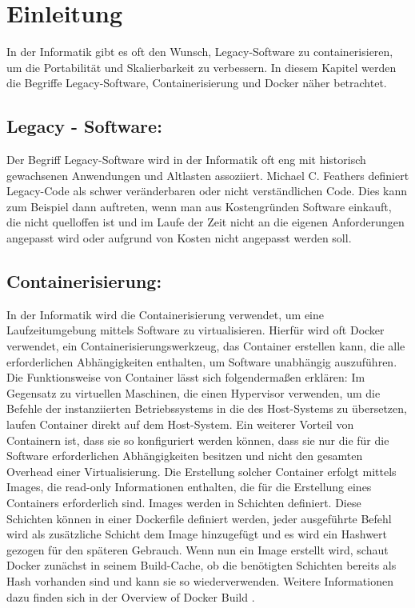 

\section{Einleitung}

In der Informatik gibt es oft den Wunsch, Legacy-Software zu containerisieren, um die Portabilität und Skalierbarkeit zu verbessern.
In diesem Kapitel werden die Begriffe Legacy-Software, Containerisierung und Docker näher betrachtet.
\subsection{Legacy - Software:}
Der Begriff Legacy-Software wird in der Informatik oft eng mit historisch gewachsenen Anwendungen und Altlasten assoziiert.
Michael C. Feathers definiert Legacy-Code als schwer veränderbaren oder nicht verständlichen Code.
Dies kann zum Beispiel dann auftreten, wenn man aus Kostengründen Software einkauft, die nicht quelloffen ist und im Laufe der Zeit nicht an die eigenen Anforderungen angepasst wird oder aufgrund von Kosten nicht angepasst werden soll. \cite{feathers2020effektives}
\subsection{Containerisierung:}
In der Informatik wird die Containerisierung verwendet, um eine Laufzeitumgebung mittels Software zu virtualisieren.
Hierfür wird oft Docker verwendet, ein Containerisierungswerkzeug, das Container erstellen kann, die alle erforderlichen Abhängigkeiten enthalten, um Software unabhängig auszuführen.
Die Funktionsweise von Container lässt sich folgendermaßen erklären: Im Gegensatz zu virtuellen Maschinen, die einen Hypervisor verwenden, um die Befehle der instanziierten Betriebssystems in die des Host-Systems zu übersetzen, laufen Container direkt auf dem Host-System.
Ein weiterer Vorteil von Containern ist, dass sie so konfiguriert werden können, dass sie nur die für die Software erforderlichen Abhängigkeiten besitzen und nicht den gesamten Overhead einer Virtualisierung.
Die Erstellung solcher Container erfolgt mittels Images, die read-only Informationen enthalten, die für die Erstellung eines Containers erforderlich sind. Images werden in Schichten definiert.
Diese Schichten können in einer Dockerfile definiert werden, jeder ausgeführte Befehl wird als zusätzliche Schicht dem Image hinzugefügt und es wird ein Hashwert gezogen für den späteren Gebrauch.
Wenn nun ein Image erstellt wird, schaut Docker zunächst in seinem Build-Cache, ob die benötigten Schichten bereits als Hash vorhanden sind und kann sie so wiederverwenden.
Weitere Informationen dazu finden sich in der Overview of Docker Build \cite{dockerbuild}.

